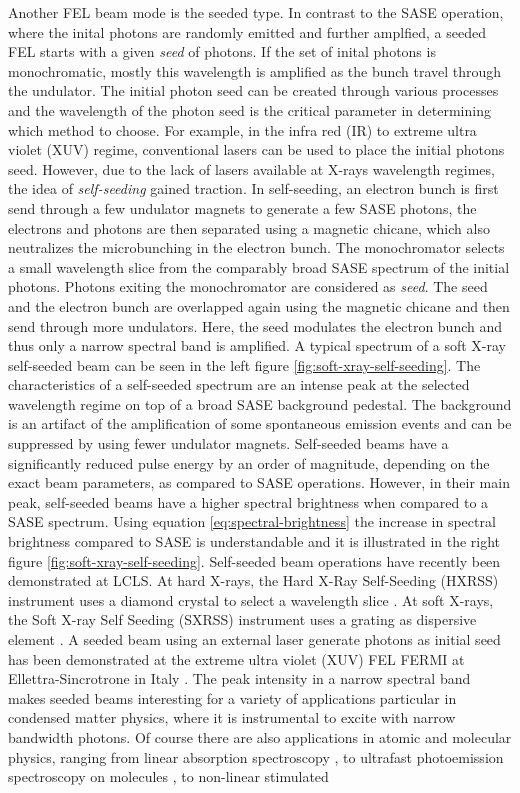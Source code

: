 Another FEL beam mode is the seeded type. In contrast to the SASE operation, where the inital photons are randomly emitted and further amplfied, a seeded FEL starts with a given \textit{seed} of photons. If the set of inital photons is monochromatic, mostly this wavelength is amplified as the bunch travel through the undulator. The initial photon seed can be created through various processes and the wavelength of the photon seed is the critical parameter in determining which method to choose. For example, in the infra red (IR) to extreme ultra violet (XUV) regime, conventional lasers can be used to place the initial photons seed. However, due to the lack of lasers available at X-rays wavelength regimes, the idea of \textit{self-seeding} gained traction. In self-seeding, an electron bunch is first send through a few undulator magnets to generate a few SASE photons, the electrons and photons are then separated using a magnetic chicane, which also neutralizes the microbunching in the electron bunch. The monochromator selects a small wavelength slice from the comparably broad SASE spectrum of the initial photons. Photons exiting the monochromator are considered as \textit{seed}. The seed and the electron bunch are overlapped again using the magnetic chicane and then send through more undulators. Here, the seed modulates the electron bunch and thus only a narrow spectral band is amplified. A typical spectrum of a soft X-ray self-seeded beam can be seen in the left figure \ref{fig:soft-xray-self-seeding}. The characteristics of a self-seeded spectrum are an intense peak at the selected wavelength regime on top of a broad SASE background pedestal. The background is an artifact of the amplification of some spontaneous emission events and can be suppressed by using fewer undulator magnets. Self-seeded beams have a significantly reduced pulse energy by an order of magnitude, depending on the exact beam parameters, as compared to SASE operations. However, in their main peak, self-seeded beams have a higher spectral brightness when compared to a SASE spectrum. Using equation \ref{eq:spectral-brightness} the increase in spectral brightness compared to SASE is understandable and it is illustrated in the right figure \ref{fig:soft-xray-self-seeding}. Self-seeded beam operations have recently been demonstrated at LCLS. At hard X-rays, the Hard X-Ray Self-Seeding (HXRSS) instrument uses a diamond crystal to select a wavelength slice \citep{Amann-2012-NatPho}. At soft X-rays, the Soft X-ray Self Seeding (SXRSS) instrument uses a grating as dispersive element \citep{Ratner-2015-PRL}. A seeded beam using an external laser generate photons as initial seed has been demonstrated at the extreme ultra violet (XUV) FEL FERMI at Ellettra-Sincrotrone in Italy \citep{Allaria-2012-NatPho}. The peak intensity in a narrow spectral band makes seeded beams interesting for a variety of applications particular in condensed matter physics, where it is instrumental to excite with narrow bandwidth photons. Of course there are also applications in atomic and molecular physics, ranging from linear absorption spectroscopy \citep{Ferguson-2014-Unpublished}, to ultrafast photoemission spectroscopy on molecules \citep{Bucher-2014-Unpublished}, to non-linear stimulated 